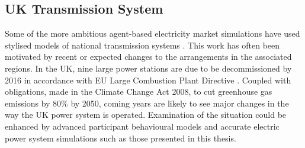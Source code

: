 \subsection{UK Transmission System}
Some of the more ambitious agent-based electricity market simulations have used
stylised models of national transmission systems
\cite{cincotti:09,weidlich:06}.  This work has often been motivated by recent
or expected changes to the arrangements in the associated regions.
In the UK, nine large power stations are due to be decommissioned by 2016 in
accordance with EU Large Combustion Plant Directive \cite{ngt07lcpd}.  Coupled
with obligations, made in the Climate Change Act 2008, to cut greenhouse gas
emissions by 80\% by 2050, coming years are likely to see major changes in the
way the UK power system is operated.
Examination of the situation could be enhanced by advanced participant
behavioural models and accurate electric power system simulations such as those
presented in this thesis.

